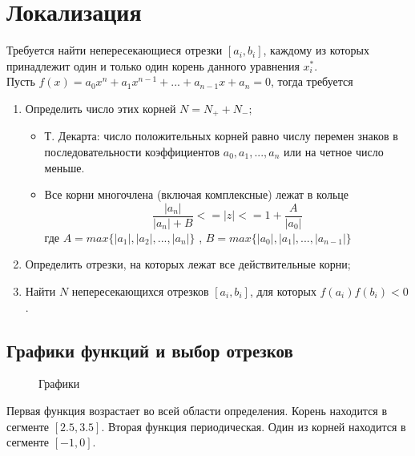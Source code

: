 \documentclass[../main.tex]{subfiles}
\begin{document}
\section{Локализация}



Требуется найти непересекающиеся отрезки $[a_i, b_i]$, каждому из которых принадлежит один и только один корень данного уравнения $x_i^*$. \\
Пусть $f(x) = a_0 x^n + a_1 x^{n - 1} + ... + a_{n - 1}x + a_n = 0 $, тогда требуется

\begin{enumerate}
    \item Определить число этих корней $N = N_+ + N_-$;
    \begin{itemize}
        \item Т. Декарта: число положительных корней равно числу перемен знаков в последовательности коэффициентов $a_0, a_1, ... , a_n$ или на четное число меньше.
        \item Все корни многочлена (включая комплексные) лежат в кольце
            $$ \frac{|a_n|}{|a_n| + B} <= |z| <= 1 + \frac{A}{|a_0|} $$
        где $ A = max\{|a_1|,|a_2|,...,|a_n|\}$ , $B = max\{|a_0|,|a_1|,...,|a_{n−1}|\} $
    \end{itemize}

    \item Определить отрезки, на которых лежат все действительные корни;
    \item Найти $N$ непересекающихся отрезков $[a_i,b_i]$, для которых $f(a_i) f(b_i) < 0$.
\end{enumerate}

\subsection{Графики функций и выбор отрезков}



\begin{figure}[ht]
    \centering
    \subfloat[\centering $ 3x + 4x^3 - 12 x^2 - 5 = 0 $]{{ }}%
    \qquad
    \subfloat[\centering $ 2 \tan (x) - \frac{x}{2} + 1 = 0 $]{{ }}%
    \caption{Графики}%
    \label{fig:example}%
\end{figure}

Первая функция возрастает во всей области определения. Корень находится в сегменте $[2.5, 3.5]$. Вторая функция периодическая. Один из корней находится в сегменте $ [-1, 0] $.
\end{document}
